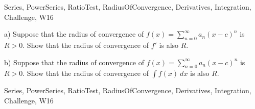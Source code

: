 \begin{tagblock}{Series, PowerSeries, RatioTest, RadiusOfConvergence, Derivatives, Integration, Challenge, W16}
\begin{question}

a) Suppose that the radius of convergence of $\displaystyle f(x)=\sum_{n=0}^{\infty} a_n(x-c)^n$ is $R>0$. Show that the radius of convergence of $f'$ is also $R$.

\bigskip

b) Suppose that the radius of convergence of $\displaystyle f(x)=\sum_{n=0}^{\infty} a_n(x-c)^n$ is $R>0$. Show that the radius of convergence of $\int f(x) \ dx$ is also $R$.
	
	
\begin{tags}
	    Series, PowerSeries, RatioTest, RadiusOfConvergence, Derivatives, Integration, Challenge, W16
\end{tags}
	
\begin{diary}
	    
\end{diary}
	
\begin{solution}
	   
\end{solution}
	
\end{question}

\end{tagblock}

 

